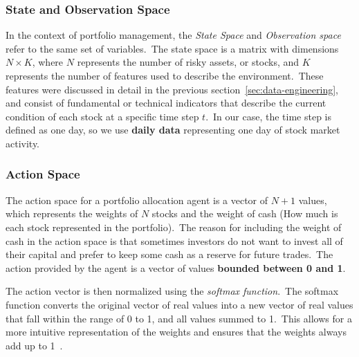 \documentclass[../xlapes02]{subfiles}
\begin{document}
    \subsubsection{State and Observation Space}\label{subsubsec:state-space}
    In the context of portfolio management, the \emph{State Space} and \emph{Observation space} refer to the same set of variables.\ The state space is a matrix with dimensions $N\times K$, where $N$ represents the number of risky assets, or stocks, and $K$ represents the number of features used to describe the environment.\ These features were discussed in detail in the previous section~\cref{sec:data-engineering}, and consist of fundamental or technical indicators that describe the current condition of each stock at a specific time step $t$.\ In our case, the time step is defined as one day, so we use \textbf{daily data} representing one day of stock market activity.

    \subsubsection{Action Space}\label{subsubsec:action-space}
    The action space for a portfolio allocation agent is a vector of $N+1$ values, which represents the weights of $N$ stocks and the weight of cash (How much is each stock represented in the portfolio).\ The reason for including the weight of cash in the action space is that sometimes investors do not want to invest all of their capital and prefer to keep some cash as a reserve for future trades.\ The action provided by the agent is a vector of values \textbf{bounded between 0 and 1}.

    The action vector is then normalized using the \emph{softmax function}.\ The softmax function converts the original vector of real values into a new vector of real values that fall within the range of 0 to 1, and all values summed to 1.\ This allows for a more intuitive representation of the weights and ensures that the weights always add up to 1~\cite{finrl-portfolio-allocation-2020}.
\end{document}
